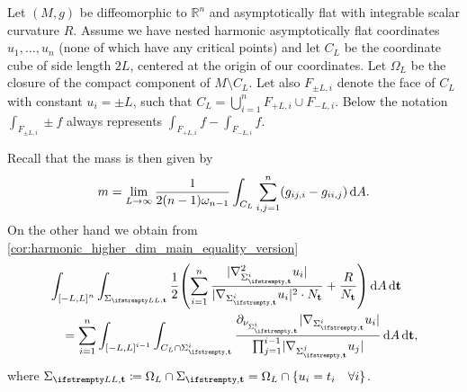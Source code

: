 \documentclass[draft]{amsart}
\newcommand*{\mathcomma}{,}
\newcommand*{\mathfullstop}{.}
\DeclarePairedDelimiter{\parens}{(}{)}
\let\p\parens %
\newcommand*{\definedas}{\coloneqq}
\newcommand*{\goesto}{\to}
\newcommand*{\reals}{\mathbb{R}}
\DeclarePairedDelimiter{\abs}{\lvert}{\rvert} %
\begin{document}
Let \( (M,g) \) be diffeomorphic to \( \reals^n \) and asymptotically flat with integrable scalar curvature \( R \). Assume we have nested harmonic asymptotically flat coordinates \( u_1,\dotsc,u_n \) (none of which have any critical points) and let \( C_L \) be the coordinate cube of side length \( 2 L \), centered at the origin of our coordinates. Let \( \Omega_L \) be the closure of the compact component of \( M\setminus C_L \). Let also \( F_{\pm L,i} \) denote the face of \( C_L \) with constant \( u_i=\pm L \), such that \( C_{L}=\bigcup_{i=1}^n F_{+L,i}\cup F_{-L,i} \). Below the notation \( \int_{F_{\pm L,i}} \pm f \) always represents \( \int_{F_{+L,i}}f-\int_{F_{-L,i}}f \).

Recall that the mass is then given by
\begin{equation*}
    m=\lim_{L \goesto \infty}\frac{1}{2(n-1)\omega_{n-1}}\int_{C_L}\sum_{i,j=1}^{n}(g_{ij,i}-g_{ii,j})\odif{A}\mathfullstop
\end{equation*}
On the other hand we obtain from \cref{cor:harmonic_higher_dim_main_equality_version}
\begin{equation}\label{eq:higher_dim_equality_applied}
    \begin{aligned}
        &\int_{\interval{-L}{L}^n}\int_{\nls[L]}\frac{1}{2}\p*{\sum_{i=1}^{n}\frac{\abs{\nabla_{\nls^i}^2 u_i}}{\abs{\nabla_{\nls^i}u_i}^2\cdot N_{\vect{t}}}+\frac{R}{N_{\vect{t}}}}\odif{A}\odif{\vect{t}}\\
        &\quad=\sum_{i=1}^{n}\int_{\interval{-L}{L}^{i-1}}\int_{C_L\cap \nls^i}\frac{\partial_{\nu_{\nls^i}}\abs{\nabla_{\nls^i}u_i}}{\prod_{j=1}^{i-1}\abs{\nabla_{\nls^j}u_j}}\odif{A}\odif{\vect{t}}\mathcomma
    \end{aligned}
\end{equation}
where \( \nls[L] \definedas \Omega_L \cap \nls=\Omega_L\cap \{u_i=t_i\quad \forall i\} \).
\end{document}
